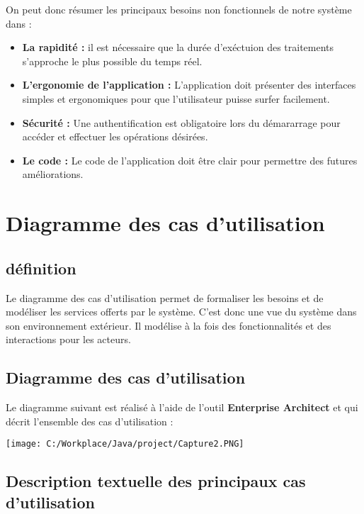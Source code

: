 \documentclass[12]{article}
\begin{document}
On peut donc résumer les principaux besoins non fonctionnels de notre système dans :\\

\begin{itemize}
\item \textbf{ La rapidité :} il est nécessaire que la durée d'exéctuion des traitements s'approche le plus possible du temps réel.
\item \textbf{ L'ergonomie de l'application :} L'application doit présenter des interfaces simples et ergonomiques pour que l'utilisateur puisse surfer facilement.

\item \textbf{ Sécurité :} Une authentification est obligatoire lors du démararrage pour accéder et effectuer les opérations désirées.

\item \textbf{ Le code :} Le code de l'application doit être clair pour permettre des futures améliorations.

\end{itemize}
\section{Diagramme des cas d'utilisation}

\subsection{définition}

Le diagramme des cas d'utilisation permet de formaliser les besoins et de modéliser les services offerts par le système. C'est donc une vue du système dans son environnement extérieur. Il modélise à la fois des fonctionnalités et des interactions pour les acteurs.

\subsection{Diagramme des cas d'utilisation}

Le diagramme suivant est réalisé à l'aide de l'outil \textbf{Enterprise  Architect} et qui décrit l'ensemble des cas d'utilisation :


\begin{center}
\texttt{[image: C:/Workplace/Java/project/Capture2.PNG]}
\end{center}
\newpage
\subsection{Description textuelle des principaux cas d'utilisation}
\end{document}
